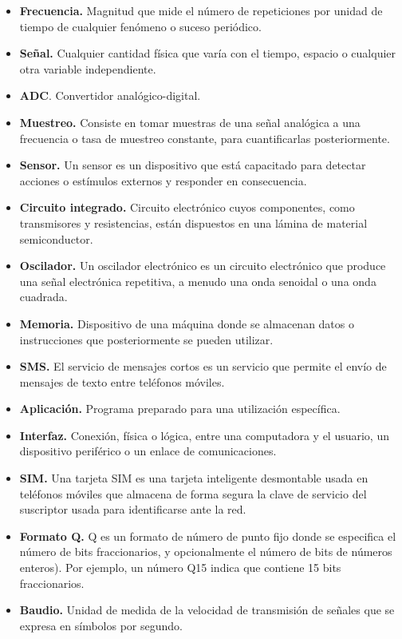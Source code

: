 
\begin{itemize}
	\item \textbf{Frecuencia.} Magnitud que mide el número de repeticiones por unidad de tiempo de cualquier fenómeno o suceso periódico.
	\item \textbf{Señal.} Cualquier cantidad física que varía con el tiempo, espacio o cualquier otra variable independiente.
	\item \textbf{ADC}. Convertidor analógico-digital.
	\item \textbf{Muestreo.} Consiste en tomar muestras de una señal analógica a una frecuencia o tasa de muestreo constante, para cuantificarlas posteriormente.
	\item \textbf{Sensor.} Un sensor es un dispositivo que está capacitado para detectar acciones o estímulos externos y responder en consecuencia.
	\item \textbf{Circuito integrado.} Circuito electrónico cuyos componentes, como transmisores y resistencias, están dispuestos en una lámina de material semiconductor.
	\item \textbf{Oscilador.} Un oscilador electrónico es un circuito electrónico que produce una señal electrónica repetitiva, a menudo una onda senoidal o una onda cuadrada.
	\item \textbf{Memoria.} Dispositivo de una máquina donde se almacenan datos o instrucciones que posteriormente se pueden utilizar.
	\item \textbf{SMS.} El servicio de mensajes cortos es un servicio que permite el envío de mensajes de texto entre teléfonos móviles.
	\item \textbf{Aplicación.} Programa preparado para una utilización específica.
	\item \textbf{Interfaz.} Conexión, física o lógica, entre una computadora y el usuario, un dispositivo periférico o un enlace de comunicaciones.
	\item \textbf{SIM.} Una tarjeta SIM es una tarjeta inteligente desmontable usada en teléfonos móviles que almacena de forma segura la clave de servicio del suscriptor usada para identificarse ante la red.
	\item \textbf{Formato Q.} Q es un formato de número de punto fijo donde se especifica el número de bits fraccionarios, y opcionalmente el número de bits de números enteros). Por ejemplo, un número Q15 indica que contiene 15 bits fraccionarios.
	\item \textbf{Baudio.} Unidad de medida de la velocidad de transmisión de señales que se expresa en símbolos por segundo.
\end{itemize}
